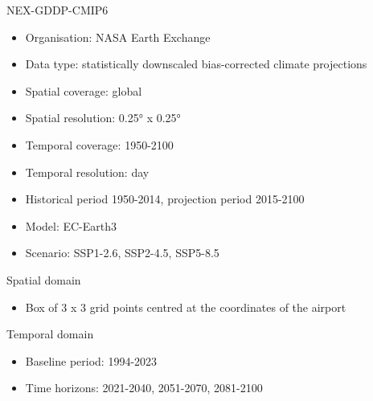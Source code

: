\documentclass[aspectratio=169]{beamer}
\begin{document}
\begin{frame}{NEX-GDDP-CMIP6}
  \begin{itemize}
    \item Organisation: NASA Earth Exchange
    \item Data type: statistically downscaled bias-corrected climate projections
    \item Spatial coverage: global
    \item Spatial resolution: 0.25° x 0.25°
    \item Temporal coverage: 1950-2100
    \item Temporal resolution: day
    \item Historical period 1950-2014, projection period 2015-2100
    \item Model: EC-Earth3
    \item Scenario: SSP1-2.6, SSP2-4.5, SSP5-8.5
  \end{itemize}
\end{frame}

\begin{frame}{Spatial domain}
  \begin{itemize}
    \item Box of 3 x 3 grid points centred at the coordinates of the airport
  \end{itemize}
\end{frame}

\begin{frame}{Temporal domain}
  \begin{itemize}
    \item Baseline period: 1994-2023
    \item Time horizons: 2021-2040, 2051-2070, 2081-2100
  \end{itemize}
\end{frame}
\end{document}
